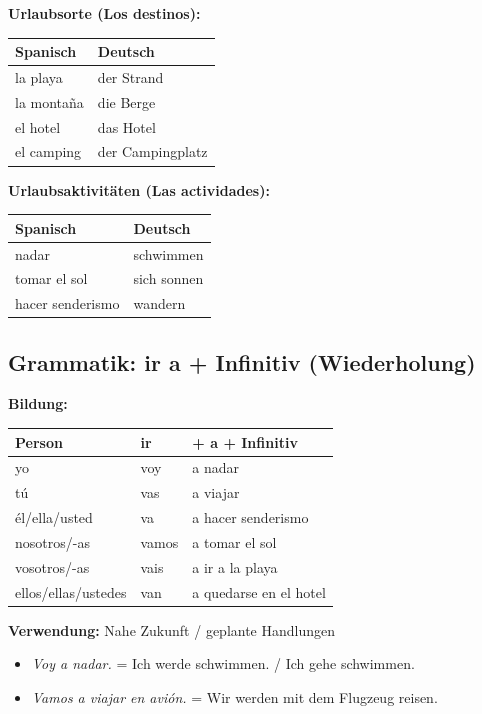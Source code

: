 \documentclass[11pt,a4paper]{article}
\begin{document}
\textbf{Urlaubsorte (Los destinos):}
\begin{center}
\begin{tabular}{|l|l|}
\hline
\textbf{Spanisch} & \textbf{Deutsch} \\
\hline
la playa & der Strand \\
la montaña & die Berge \\
el hotel & das Hotel \\
el camping & der Campingplatz \\
\hline
\end{tabular}
\end{center}

\textbf{Urlaubsaktivitäten (Las actividades):}
\begin{center}
\begin{tabular}{|l|l|}
\hline
\textbf{Spanisch} & \textbf{Deutsch} \\
\hline
nadar & schwimmen \\
tomar el sol & sich sonnen \\
hacer senderismo & wandern \\
\hline
\end{tabular}
\end{center}

\subsection{Grammatik: ir a + Infinitiv (Wiederholung)}

\textbf{Bildung:}
\begin{center}
\begin{tabular}{|l|l|l|}
\hline
\textbf{Person} & \textbf{ir} & \textbf{+ a + Infinitiv} \\
\hline
yo & voy & a nadar \\
tú & vas & a viajar \\
él/ella/usted & va & a hacer senderismo \\
nosotros/-as & vamos & a tomar el sol \\
vosotros/-as & vais & a ir a la playa \\
ellos/ellas/ustedes & van & a quedarse en el hotel \\
\hline
\end{tabular}
\end{center}

\textbf{Verwendung:} Nahe Zukunft / geplante Handlungen
\begin{itemize}
    \item \textit{Voy a nadar.} = Ich werde schwimmen. / Ich gehe schwimmen.
    \item \textit{Vamos a viajar en avión.} = Wir werden mit dem Flugzeug reisen.
\end{itemize}
\end{document}
